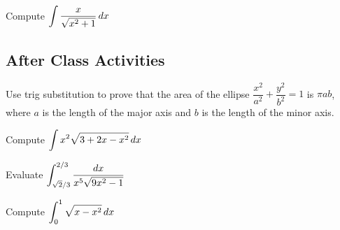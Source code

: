 \documentclass[notes]{subfiles}
\begin{document}
		\begin{ex}
			Compute $\displaystyle \int \dfrac{x}{\sqrt{x^2 + 1}}\, dx$
		\end{ex}
			
		\newpage
	\subsection*{After Class Activities}
		\begin{ex}
			Use trig substitution to prove that the area of the ellipse $\dfrac{x^2}{a^2} + \dfrac{y^2}{b^2} = 1$ is $\pi ab$, where $a$ is the length of the major axis and $b$ is the length of the minor axis. 
		\end{ex}
			
		\begin{ex}
			Compute $\displaystyle \int x^2\sqrt{3+2x-x^2}\, dx$
		\end{ex}
			\newpage
			
		\begin{ex}
			Evaluate $\displaystyle \int_{\sqrt{2}/3}^{2/3} \dfrac{dx}{x^5\sqrt{9x^2-1}}$
		\end{ex}
			
		\begin{ex}
			Compute $\displaystyle \int_0^1 \sqrt{x-x^2}\, dx$
		\end{ex}
	
\clearpage
\end{document}
